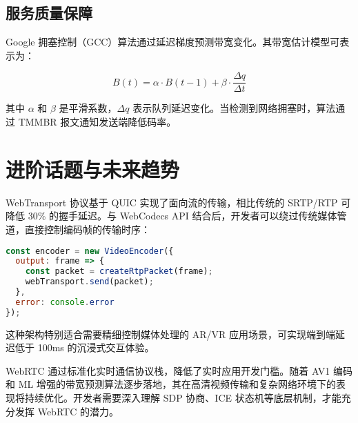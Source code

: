 \section{服务质量保障}
Google 拥塞控制（GCC）算法通过延迟梯度预测带宽变化。其带宽估计模型可表示为：\par
$$ B(t) = \alpha \cdot B(t-1) + \beta \cdot \frac{\Delta q}{\Delta t} $$\par
其中 $\alpha$ 和 $\beta$ 是平滑系数，$\Delta q$ 表示队列延迟变化。当检测到网络拥塞时，算法通过 TMMBR 报文通知发送端降低码率。\par
\chapter{进阶话题与未来趋势}
WebTransport 协议基于 QUIC 实现了面向流的传输，相比传统的 SRTP/RTP 可降低 30\%{} 的握手延迟。与 WebCodecs API 结合后，开发者可以绕过传统媒体管道，直接控制编码帧的传输时序：\par
\begin{lstlisting}[language=javascript]
const encoder = new VideoEncoder({
  output: frame => {
    const packet = createRtpPacket(frame);
    webTransport.send(packet);
  },
  error: console.error
});
\end{lstlisting}
这种架构特别适合需要精细控制媒体处理的 AR/VR 应用场景，可实现端到端延迟低于 100ms 的沉浸式交互体验。\par
WebRTC 通过标准化实时通信协议栈，降低了实时应用开发门槛。随着 AV1 编码和 ML 增强的带宽预测算法逐步落地，其在高清视频传输和复杂网络环境下的表现将持续优化。开发者需要深入理解 SDP 协商、ICE 状态机等底层机制，才能充分发挥 WebRTC 的潜力。\par
